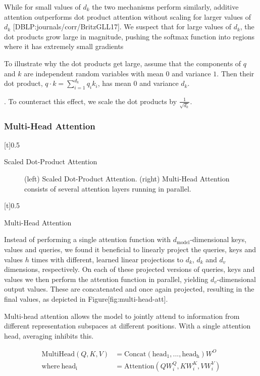 \documentclass[11pt,a4paper]{article}
\begin{document}
While for small values of $d_k$ the two mechanisms perform similarly, additive attention outperforms dot product attention without scaling for larger values of $d_k$ [DBLP:journals/corr/BritzGLL17]. We suspect that for large values of $d_k$, the dot products grow large in magnitude, pushing the softmax function into regions where it has extremely small gradients

To illustrate why the dot products get large, assume that the components of $q$ and $k$ are independent random variables with mean $0$ and variance $1$.  Then their dot product, $q \cdot k = \sum_{i=1}^{d_k} q_ik_i$, has mean $0$ and variance $d_k$.

. To counteract this effect, we scale the dot products by $\frac{1}{\sqrt{d_k}}$.

\subsubsection{Multi-Head Attention}

[t]0.5

Scaled Dot-Product Attention

\begin{figure}[h]
\caption{(left) Scaled Dot-Product Attention. (right) Multi-Head Attention consists of several attention layers running in parallel.}
\end{figure}

[t]0.5

Multi-Head Attention

\begin{figure}[h]
\end{figure}

Instead of performing a single attention function with $d_{\text{model}}$-dimensional keys, values and queries, we found it beneficial to linearly project the queries, keys and values $h$ times with different, learned linear projections to $d_k$, $d_k$ and $d_v$ dimensions, respectively. On each of these projected versions of queries, keys and values we then perform the attention function in parallel, yielding $d_v$-dimensional output values. These are concatenated and once again projected, resulting in the final values, as depicted in Figure[fig:multi-head-att].

Multi-head attention allows the model to jointly attend to information from different representation subspaces at different positions. With a single attention head, averaging inhibits this.

$$\begin{align*}
    \mathrm{MultiHead}(Q, K, V) &= \mathrm{Concat}(\mathrm{head_1}, ..., \mathrm{head_h})W^O\\
    \text{where}~\mathrm{head_i} &= \mathrm{Attention}(QW^Q_i, KW^K_i, VW^V_i)\\
\end{align*}$$
\end{document}
